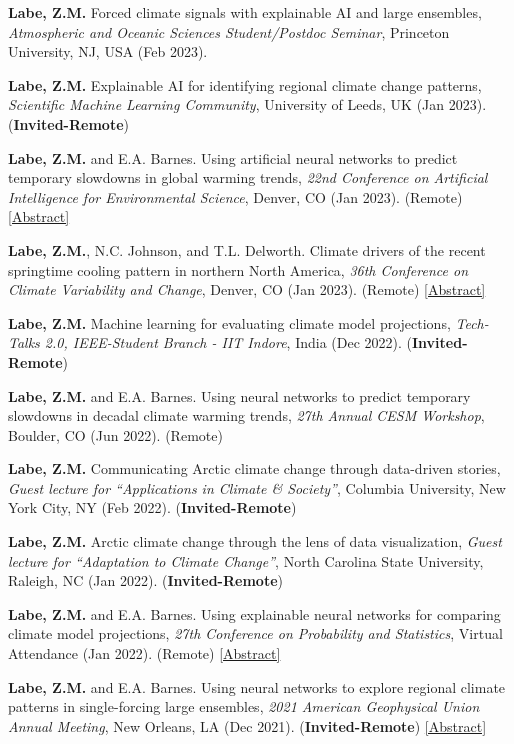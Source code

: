 \documentclass[margin,line,palatino,courier,10pt]{res}
\begin{document}
\begin{resume}
\begin{etaremune}[leftmargin=0in,topsep=0in,parsep=0in]
\item \textbf{Labe, Z.M.} Forced climate signals with explainable AI and large ensembles, \textit{Atmospheric and Oceanic Sciences Student/Postdoc Seminar}, Princeton University, NJ, USA (Feb 2023).
\item \textbf{Labe, Z.M.} Explainable AI for identifying regional climate change patterns, \textit{Scientific Machine Learning Community}, University of Leeds, UK (Jan 2023). (\textbf{Invited-Remote})
\item \textbf{Labe, Z.M.} and E.A. Barnes. Using artificial neural networks to predict temporary slowdowns in global warming trends, \textit{22nd Conference on Artificial Intelligence for Environmental Science}, Denver, CO (Jan 2023). (Remote) \href{https://ams.confex.com/ams/103ANNUAL/meetingapp.cgi/Paper/415460}{[Abstract]}
\item \textbf{Labe, Z.M.}, N.C. Johnson, and T.L. Delworth. Climate drivers of the recent springtime cooling pattern in northern North America, \textit{36th Conference on Climate Variability and Change}, Denver, CO (Jan 2023). (Remote) \href{https://ams.confex.com/ams/103ANNUAL/meetingapp.cgi/Paper/415409}{[Abstract]}
\item \textbf{Labe, Z.M.} Machine learning for evaluating climate model projections, \textit{Tech-Talks 2.0, IEEE-Student Branch - IIT Indore}, India (Dec 2022). (\textbf{Invited-Remote})
\item \textbf{Labe, Z.M.} and E.A. Barnes. Using neural networks to predict temporary slowdowns in decadal climate warming trends, \textit{27th Annual CESM Workshop}, Boulder, CO (Jun 2022). (Remote)
\item \textbf{Labe, Z.M.} Communicating Arctic climate change through data-driven stories, \textit{Guest lecture for ``Applications in Climate \& Society''}, Columbia University, New York City, NY (Feb 2022). (\textbf{Invited-Remote}) 
\item \textbf{Labe, Z.M.} Arctic climate change through the lens of data visualization, \textit{Guest lecture for ``Adaptation to Climate Change''}, North Carolina State University, Raleigh, NC (Jan 2022). (\textbf{Invited-Remote}) 
\item \textbf{Labe, Z.M.} and E.A. Barnes. Using explainable neural networks for comparing climate model projections, \textit{27th Conference on Probability and Statistics}, Virtual Attendance (Jan 2022). (Remote) \href{https://ams.confex.com/ams/102ANNUAL/meetingapp.cgi/Paper/392538}{[Abstract]}
\item \textbf{Labe, Z.M.} and E.A. Barnes. Using neural networks to explore regional climate patterns in single-forcing large ensembles, \textit{2021 American Geophysical Union Annual Meeting}, New Orleans, LA (Dec 2021). (\textbf{Invited-Remote}) \href{https://agu.confex.com/agu/fm21/meetingapp.cgi/Paper/798039}{[Abstract]}

\end{etaremune}
\end{resume}
\end{document}
